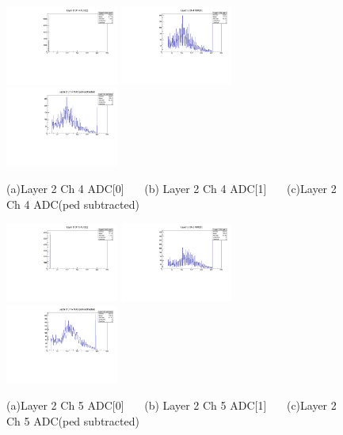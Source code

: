 \documentclass[a4paper,11pt]{article}
\theoremstyle{mytheor}
\begin{document}
\begin{figure}[H] 
\vspace*{-0.3cm} 
\includegraphics[width=0.33\textwidth,scale=0.5,trim=0 0 0 0,clip]{plotsdir/file0_muons-Layer2_Ch4_adc0-1.pdf} 
\includegraphics[width=0.33\textwidth,scale=0.5,trim=0 0 0 0,clip]{plotsdir/file0_muons-Layer2_Ch4_adc1-1.pdf} 
\includegraphics[width=0.33\textwidth,scale=0.5,trim=0 0 0 0,clip]{plotsdir/file0_muons-Layer2_Ch4_adcPedsub-1.pdf} 
\caption{(a)Layer 2 Ch 4 ADC[0] ~~~(b) Layer 2 Ch 4 ADC[1] ~~~(c)Layer 2 Ch 4 ADC(ped subtracted) } 
\end{figure} 
\clearpage 
\begin{figure}[H] 
\vspace*{-0.3cm} 
\includegraphics[width=0.33\textwidth,scale=0.5,trim=0 0 0 0,clip]{plotsdir/file0_muons-Layer2_Ch5_adc0-1.pdf} 
\includegraphics[width=0.33\textwidth,scale=0.5,trim=0 0 0 0,clip]{plotsdir/file0_muons-Layer2_Ch5_adc1-1.pdf} 
\includegraphics[width=0.33\textwidth,scale=0.5,trim=0 0 0 0,clip]{plotsdir/file0_muons-Layer2_Ch5_adcPedsub-1.pdf} 
\caption{(a)Layer 2 Ch 5 ADC[0] ~~~(b) Layer 2 Ch 5 ADC[1] ~~~(c)Layer 2 Ch 5 ADC(ped subtracted) } 
\end{figure} 
\end{document}
